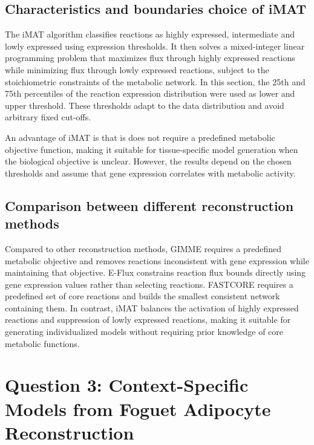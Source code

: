\documentclass[11pt, a4paper]{article}
\begin{document}
\subsection{Characteristics and boundaries choice of iMAT}
The iMAT algorithm classifies reactions as highly expressed, intermediate and lowly expressed using expression thresholds. It then solves a mixed-integer linear programming problem that maximizes flux through highly expressed reactions while minimizing flux through lowly expressed reactions, subject to the stoichiometric constraints of the metabolic network. In this section, the 25th and 75th percentiles of the reaction expression distribution were used as lower and upper threshold. These thresholds adapt to the data distribution and avoid arbitrary fixed cut-offs.

An advantage of iMAT is that is does not require a predefined metabolic objective function, making it suitable for tissue-specific model generation when the biological objective is unclear. However, the results depend on the chosen thresholds and assume that gene expression correlates with metabolic activity.

\subsection{Comparison between different reconstruction methods}
Compared to other reconstruction methods, GIMME requires a predefined metabolic objective and removes reactions inconsistent with gene expression while maintaining that objective. E-Flux constrains reaction flux bounds directly using gene expression values rather than selecting reactions. FASTCORE requires a predefined set of core reactions and builds the smallest consistent network containing them. In contrast, iMAT balances the activation of highly expressed reactions and suppression of lowly expressed reactions, making it suitable for generating individualized models without requiring prior knowledge of core metabolic functions.


\section{Question 3: Context-Specific Models from Foguet Adipocyte Reconstruction}
\label{sec:q3}
\end{document}
